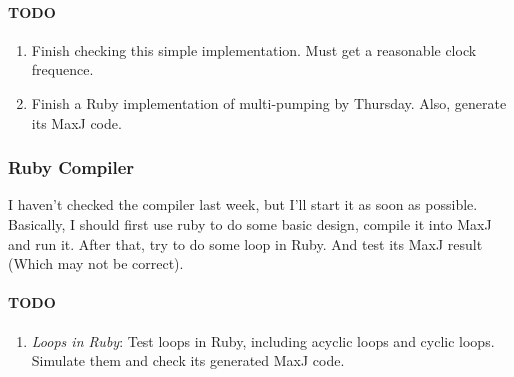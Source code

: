 \paragraph{TODO}
\begin{enumerate}
\item Finish checking this simple implementation. Must get a reasonable clock frequence.
\item Finish a Ruby implementation of multi-pumping by Thursday. Also, generate its MaxJ code.
\end{enumerate}

\subsubsection{Ruby Compiler}

I haven't checked the compiler last week, but I'll start it as soon as possible. Basically, I should first use ruby to do some basic design, compile it into MaxJ and run it. After that, try to do some loop in Ruby. And test its MaxJ result (Which may not be correct).

\paragraph{TODO}
\begin{enumerate}
\item \textit{Loops in Ruby}: Test loops in Ruby, including acyclic loops and cyclic loops. Simulate them and check its generated MaxJ code.
\end{enumerate}



